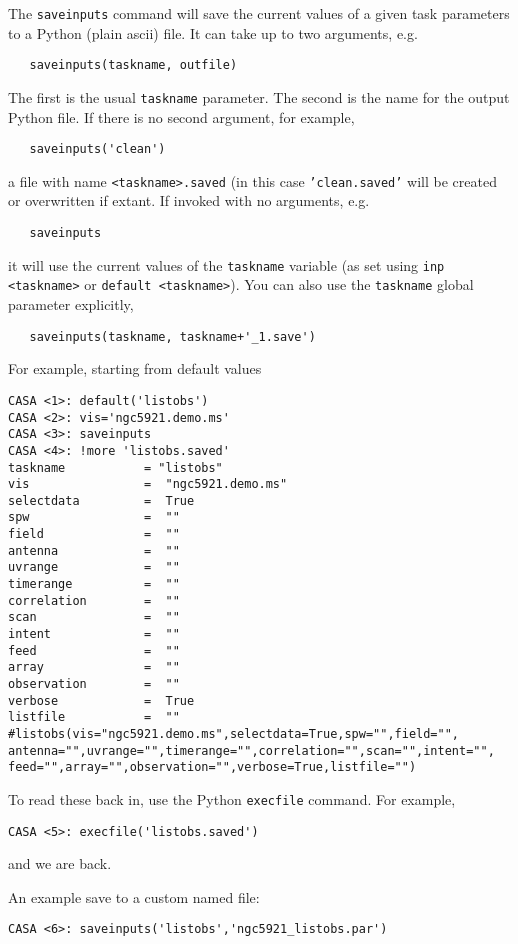 The {\tt saveinputs} command will save the current values of
a given task parameters to a Python (plain ascii) file.  It
can take up to two arguments, e.g.
\small
\begin{verbatim}
   saveinputs(taskname, outfile)
\end{verbatim}
\normalsize
The first is the usual {\tt taskname} parameter.  
The second is the name for the
output Python file.  If there is no second argument, for example,
\small
\begin{verbatim}
   saveinputs('clean')
\end{verbatim}
\normalsize
a file with name {\tt <taskname>.saved} (in this case 
{\tt 'clean.saved'} will be created or 
overwritten if extant.  If invoked with no arguments, e.g.
\small
\begin{verbatim}
   saveinputs
\end{verbatim}
\normalsize
it will use the current values of the {\tt taskname} variable
(as set using {\tt inp <taskname>} or {\tt default <taskname>}).
You can also use the {\tt taskname} global parameter explicitly,
\small
\begin{verbatim}
   saveinputs(taskname, taskname+'_1.save')
\end{verbatim}
\normalsize

For example, starting from default values
\small
\begin{verbatim}
CASA <1>: default('listobs')
CASA <2>: vis='ngc5921.demo.ms'
CASA <3>: saveinputs
CASA <4>: !more 'listobs.saved' 
taskname           = "listobs"
vis                =  "ngc5921.demo.ms"
selectdata         =  True
spw                =  ""
field              =  ""
antenna            =  ""
uvrange            =  ""
timerange          =  ""
correlation        =  ""
scan               =  ""
intent             =  ""
feed               =  ""
array              =  ""
observation        =  ""
verbose            =  True
listfile           =  ""
#listobs(vis="ngc5921.demo.ms",selectdata=True,spw="",field="",
antenna="",uvrange="",timerange="",correlation="",scan="",intent="",
feed="",array="",observation="",verbose=True,listfile="")

\end{verbatim}
\normalsize
To read these back in, use the Python {\tt execfile} command.  For example,
\small
\begin{verbatim}
CASA <5>: execfile('listobs.saved')
\end{verbatim}
\normalsize
and we are back.

An example save to a custom named file:
\small
\begin{verbatim}
CASA <6>: saveinputs('listobs','ngc5921_listobs.par')
\end{verbatim}
\normalsize

